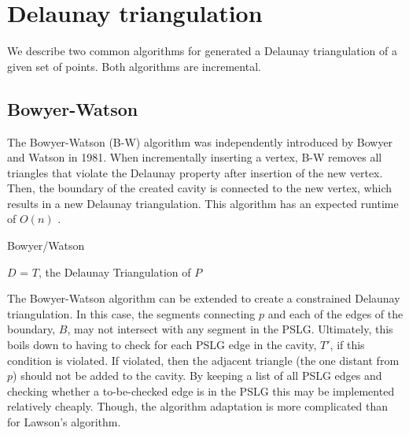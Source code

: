 \section{Delaunay triangulation}
\label{sec:triangulation}

We describe two common algorithms for generated a Delaunay triangulation of a given set of points.
Both algorithms are incremental.

\subsection{Bowyer-Watson}
\label{sub:bowyer_watson}

The Bowyer-Watson (B-W) algorithm was independently introduced by Bowyer \cite{art:Bowyer1981} and Watson \cite{art:Watson1981} in 1981.
When incrementally inserting a vertex, B-W removes all triangles that violate the Delaunay property after insertion of the new vertex.
Then, the boundary of the created cavity is connected to the new vertex, which results in a new Delaunay triangulation.
This algorithm has an expected runtime of $O(n)$ \cite{shewchuk}.

\begin{algorithm}
    \caption{Bowyer/Watson}
    \begin{algorithmic}
            \EndFor
            \Return $D$ = $T$, the Delaunay Triangulation of $P$
        \EndFunction
    \end{algorithmic}
\end{algorithm}

The Bowyer-Watson algorithm can be extended to create a constrained Delaunay triangulation.
In this case, the segments connecting $p$ and each of the edges of the boundary, $B$, may not
intersect with any segment in the PSLG.
Ultimately, this boils down to having to check for each PSLG edge in the cavity, $T'$, if this condition is violated.
If violated, then the adjacent triangle (the one distant from $p$) should not be added to the cavity.
By keeping a list of all PSLG edges and checking whether a to-be-checked edge is in the PSLG this may be implemented relatively cheaply.
Though, the algorithm adaptation is more complicated than for Lawson's algorithm.

